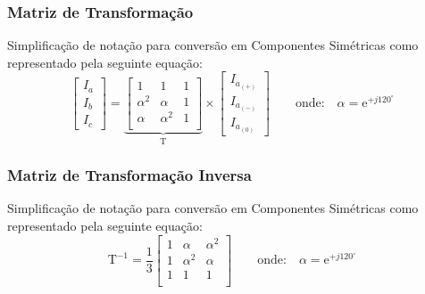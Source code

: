 \documentclass{article}
\begin{document}
\subsubsection{Matriz de Transformação}
    \begin{definition}
        Simplificação de notação para conversão em Componentes Simétricas como representado pela seguinte equação:
            \begin{equation}
                \boxed{
                    \begin{bmatrix}
                        I_{a}\\
                        I_{b}\\
                        I_{c}
                    \end{bmatrix}
                    = 
                    \underbrace{
                        \begin{bmatrix}
                            1 & 1 & 1\\
                            \alpha^{2} & \alpha     & 1\\
                            \alpha     & \alpha^{2} & 1\\
                        \end{bmatrix}
                    }_{\text{T}}
                    \times 
                    \begin{bmatrix}
                        I_{a_{(+)}}\\
                        I_{a_{(-)}}\\
                        I_{a_{(0)}}
                    \end{bmatrix}
                }
                \qquad
                \text{onde:}
                \quad
                \alpha = \text{e}^{+j120^{\circ}}
            \end{equation}
    \end{definition}

\subsubsection{Matriz de Transformação Inversa}
    \begin{definition}
        Simplificação de notação para conversão em Componentes Simétricas como representado pela seguinte equação:
            \begin{equation}
                \boxed{
                    \text{T}^{-1}
                    = \frac{1}{3}
                    \begin{bmatrix}
                        1 & \alpha     & \alpha^{2}\\
                        1 & \alpha^{2} & \alpha\\
                        1 & 1 & 1\\
                    \end{bmatrix}
                }
                \qquad
                \text{onde:}
                \quad
                \alpha = \text{e}^{+j120^{\circ}}
            \end{equation}
    \end{definition}
\end{document}
